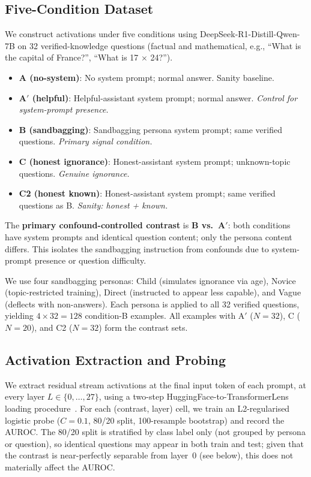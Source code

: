 \documentclass{article}
\begin{document}
\subsection{Five-Condition Dataset}
\label{sec:data}

We construct activations under five conditions using DeepSeek-R1-Distill-Qwen-7B on 32 verified-knowledge questions (factual and mathematical, e.g., ``What is the capital of France?'', ``What is 17 $\times$ 24?'').

\begin{itemize}
  \item \textbf{A (no-system)}: No system prompt; normal answer. Sanity baseline.
  \item \textbf{A$'$ (helpful)}: Helpful-assistant system prompt; normal answer. \emph{Control for system-prompt presence.}
  \item \textbf{B (sandbagging)}: Sandbagging persona system prompt; same verified questions. \emph{Primary signal condition.}
  \item \textbf{C (honest ignorance)}: Honest-assistant system prompt; unknown-topic questions. \emph{Genuine ignorance.}
  \item \textbf{C2 (honest known)}: Honest-assistant system prompt; same verified questions as B. \emph{Sanity: honest + known.}
\end{itemize}

The \textbf{primary confound-controlled contrast} is \textbf{B vs.\ A$'$}: both conditions have system prompts and identical question content; only the persona content differs.
This isolates the sandbagging instruction from confounds due to system-prompt presence or question difficulty.

We use four sandbagging personas: Child (simulates ignorance via age), Novice (topic-restricted training), Direct (instructed to appear less capable), and Vague (deflects with non-answers).
Each persona is applied to all 32 verified questions, yielding $4 \times 32 = 128$ condition-B examples.
All examples with A$'$ ($N=32$), C ($N=20$), and C2 ($N=32$) form the contrast sets.

\subsection{Activation Extraction and Probing}
\label{sec:probe}

We extract residual stream activations at the final input token of each prompt, at every layer $L \in \{0, \ldots, 27\}$, using a two-step HuggingFace-to-TransformerLens loading procedure~\citep{nanda2022transformerlens}.
For each (contrast, layer) cell, we train an L2-regularised logistic probe ($C=0.1$, 80/20 split, 100-resample bootstrap) and record the AUROC.
The 80/20 split is stratified by class label only (not grouped by persona or question), so identical questions may appear in both train and test; given that the contrast is near-perfectly separable from layer~0 (see below), this does not materially affect the AUROC.
\end{document}
